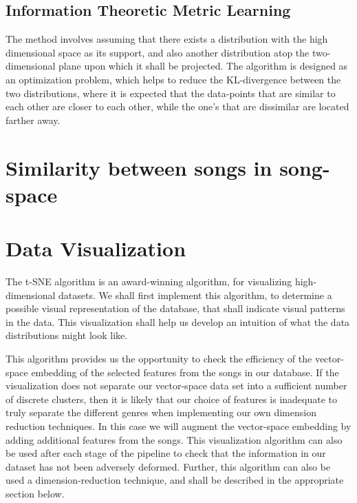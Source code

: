 \documentclass[12pt]{article}
\begin{document}
\subsection{Information Theoretic Metric Learning}

The method involves assuming that there exists a distribution with the high dimensional space as its support, and also another distribution atop the two-dimensional plane upon which it shall be projected. The algorithm is designed as an optimization problem, which helps to reduce the KL-divergence between the two distributions, where it is expected that the data-points that are similar to each other are closer to each other, while the one's that are dissimilar are located farther away. 

\section{Similarity between songs in song-space}


\section{Data Visualization}
The t-SNE algorithm \cite{tSNEdataViz} is an award-winning algorithm, for visualizing high-dimensional datasets. We shall first implement this algorithm, to determine a possible visual representation of the database, that shall indicate visual patterns in the data. This visualization shall help us develop an intuition of what the data distributions might look like. 

This algorithm provides us the opportunity to check the efficiency of the vector-space embedding of the selected features from the songs in our database.  If the visualization does not separate our vector-space data set into a sufficient number of discrete clusters, then it is likely that our choice of features is inadequate to truly separate the different genres when implementing our own dimension reduction techniques.  In this case we will augment the vector-space embedding by adding additional features from the songs.  This visualization algorithm can also be used after each stage of the pipeline to check that the information in our dataset has not been adversely deformed. Further, this algorithm can also be used a dimension-reduction technique, and shall be described in the appropriate section below.
\end{document}
